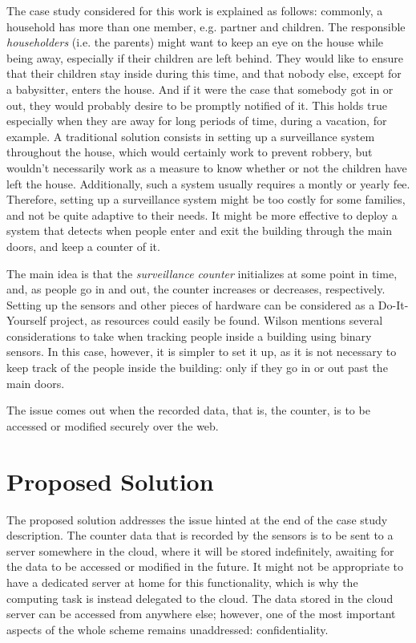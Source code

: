 The case study considered for this work is explained as follows: commonly, a household has more than one member, e.g. partner and children. The responsible \emph{householders} (i.e. the parents) might want to keep an eye on the house while being away, especially if their children are left behind. They would like to ensure that their children stay inside during this time, and that nobody else, except for a babysitter, enters the house. And if it were the case that somebody got in or out, they would probably desire to be promptly notified of it. This holds true especially when they are away for long periods of time, during a vacation, for example. A traditional solution consists in setting up a surveillance system throughout the house, which would certainly work to prevent robbery, but wouldn't necessarily work as a measure to know whether or not the children have left the house. Additionally, such a system usually requires a montly or yearly fee. Therefore, setting up a surveillance system might be too costly for some families, and not be quite adaptive to their needs. It might be more effective to deploy a system that detects when people enter and exit the building through the main doors, and keep a counter of it. 

The main idea is that the \emph{surveillance counter} initializes at some point in time, and, as people go in and out, the counter increases or decreases, respectively. Setting up the sensors and other pieces of hardware can be considered as a Do-It-Yourself project, as resources could easily be found. Wilson \cite{wilson2005simultaneous} mentions several considerations to take when tracking people inside a building using binary sensors. In this case, however, it is simpler to set it up, as it is not necessary to keep track of the people inside the building: only if they go in or out past the main doors. 

The issue comes out when the recorded data, that is, the counter, is to be accessed or modified securely over the web. 

\section{{Proposed Solution}}

The proposed solution addresses the issue hinted at the end of the case study description. The counter data that is recorded by the sensors is to be sent to a server somewhere in the cloud, where it will be stored indefinitely, awaiting for the data to be accessed or modified in the future. It might not be appropriate to have a dedicated server at home for this functionality, which is why the computing task is instead delegated to the cloud. The data stored in the cloud server can be accessed from anywhere else; however, one of the most important aspects of the whole scheme remains unaddressed: confidentiality.


